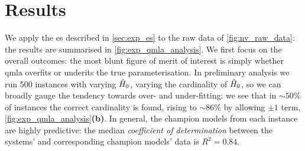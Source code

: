 \section{Results}

We apply the \gls{es} described in \cref{sec:exp_es} to the raw data of \cref{fig:nv_raw_data}:
    the results are summarised in \cref{fig:exp_qmla_analysis}.
We first focus on the overall outcomes:
    the most blunt figure of merit of interest is simply whether \gls{qmla}
    overfits or underits the true parameterisation. 
In preliminary analysis we run 500 \glspl{instance} with varying $\hat{H}_0$, 
    varying the cardinality of $\hat{H}_0$,
    so we can broadly gauge the tendency towards over- and under-fitting:
    we see that in $\sim50\%$ of \glspl{instance} the correct cardinality is found,  
    rising to $\sim86\%$ by allowing $\pm1$ term, \cref{fig:exp_qmla_analysis}\textbf{(b)}. 
In general, the \glspl{champion model} from each instance are highly predictive: 
    the median \emph{coefficient of determination} between the systems' and corresponding \glspl{champion model}' data is 
    $R^2 = 0.84$. 
\par 

